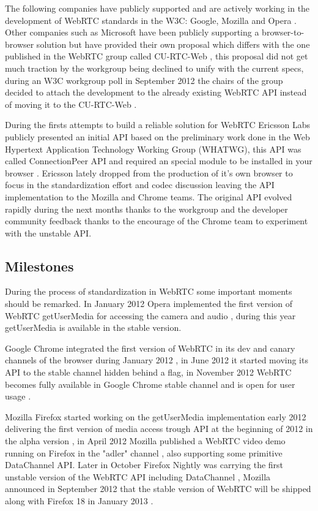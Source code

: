 The following companies have publicly supported and are actively working in the development of WebRTC standards in the W3C: Google, Mozilla and Opera \cite{googleAnnouncement}. Other companies such as Microsoft have been publicly supporting a browser-to-browser solution but have provided their own proposal which differs with the one published in the WebRTC group called CU-RTC-Web \cite{curtcweb}, this proposal did not get much traction by the workgroup being declined to unify with the current specs, during an W3C workgroup poll in September 2012 the chairs of the group decided to attach the development to the already existing WebRTC API instead of moving it to the CU-RTC-Web \cite{curtcpoll}.

During the firsts attempts to build a reliable solution for WebRTC Ericsson Labs publicly presented an initial API based on the preliminary work done in the Web Hypertext Application Technology Working Group (WHATWG), this API was called ConnectionPeer API and required an special module to be installed in your browser \cite{ericssonwebrtc}. Ericsson lately dropped from the production of it's own browser to focus in the standardization effort and codec discussion leaving the API implementation to the Mozilla and Chrome teams. The original API evolved rapidly during the next months thanks to the workgroup and the developer community feedback thanks to the encourage of the Chrome team to experiment with the unstable API.


\subsection{Milestones}

During the process of standardization in WebRTC some important moments should be remarked. In January 2012 Opera implemented the first version of WebRTC getUserMedia for accessing the camera and audio \cite{operaannouncement}, during this year getUserMedia is available in the stable version. 

Google Chrome integrated the first version of WebRTC in its dev and canary channels of the browser during January 2012 \cite{chromeannouncement}, in June 2012 it started moving its API to the stable channel hidden behind a flag, in November 2012 WebRTC becomes fully available in Google Chrome stable channel and is open for user usage \cite{chromestable}. 

Mozilla Firefox started working on the getUserMedia implementation early 2012 delivering the first version of media access trough API at the beginning of 2012 in the alpha version \cite{mozillablog}, in April 2012 Mozilla published a WebRTC video demo running on Firefox in the "adler" channel \cite{mozillawebrtc}, also supporting some primitive DataChannel API. Later in October Firefox Nightly was carrying the first unstable version of the WebRTC API including DataChannel \cite{mozillafinal}, Mozilla announced in September 2012 that the stable version of WebRTC will be shipped along with Firefox 18 in January 2013 \cite{mozillacomming}. 

